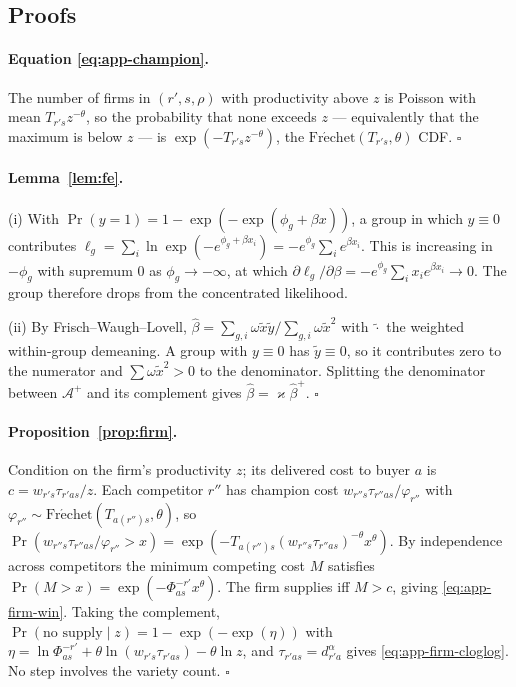 \subsection{Proofs}
\label{app:model-proofs}

\paragraph{Equation \eqref{eq:app-champion}.} The number of firms in $(r',s,\rho)$ with
productivity above $z$ is Poisson with mean $T_{r's}z^{-\theta}$, so the probability that none
exceeds $z$ --- equivalently that the maximum is below $z$ --- is $\exp(-T_{r's}z^{-\theta})$,
the $\mathrm{Fr\acute{e}chet}(T_{r's},\theta)$ CDF. \hfill$\square$

\paragraph{Lemma~\ref{lem:fe}.} (i) With $\Pr(y=1)=1-\exp(-\exp(\phi_{g}+\beta x))$, a group in
which $y\equiv0$ contributes
$\ell_{g}=\sum_{i}\ln\exp(-e^{\phi_{g}+\beta x_{i}})=-e^{\phi_{g}}\sum_{i}e^{\beta x_{i}}$. This
is increasing in $-\phi_{g}$ with supremum $0$ as $\phi_{g}\to-\infty$, at which
$\partial\ell_{g}/\partial\beta=-e^{\phi_{g}}\sum_{i}x_{i}e^{\beta x_{i}}\to0$. The group
therefore drops from the concentrated likelihood.

(ii) By Frisch--Waugh--Lovell,
$\hat\beta=\sum_{g,i}\omega\tilde x\tilde y/\sum_{g,i}\omega\tilde x^{2}$ with $\tilde{\cdot}$
the weighted within-group demeaning. A group with $y\equiv0$ has $\tilde y\equiv0$, so it
contributes zero to the numerator and $\sum\omega\tilde x^{2}>0$ to the denominator. Splitting
the denominator between $\mathcal{A}^{+}$ and its complement gives
$\hat\beta=\varkappa\hat\beta^{+}$. \hfill$\square$

\paragraph{Proposition~\ref{prop:firm}.} Condition on the firm's productivity $z$; its delivered
cost to buyer $a$ is $c=w_{r's}\tau_{r'as}/z$. Each competitor $r''$ has champion cost
$w_{r''s}\tau_{r''as}/\varphi_{r''}$ with
$\varphi_{r''}\sim\mathrm{Fr\acute{e}chet}(T_{a(r'')s},\theta)$, so
$\Pr(w_{r''s}\tau_{r''as}/\varphi_{r''}>x)=\exp(-T_{a(r'')s}(w_{r''s}\tau_{r''as})^{-\theta}x^{\theta})$.
By independence across competitors the minimum competing cost $M$ satisfies
$\Pr(M>x)=\exp(-\Phi^{-r'}_{as}x^{\theta})$. The firm supplies iff $M>c$, giving
\eqref{eq:app-firm-win}. Taking the complement,
$\Pr(\text{no supply}\mid z)=1-\exp(-\exp(\eta))$ with
$\eta=\ln\Phi^{-r'}_{as}+\theta\ln(w_{r's}\tau_{r'as})-\theta\ln z$, and
$\tau_{r'as}=d_{r'a}^{\alpha}$ gives \eqref{eq:app-firm-cloglog}. No step involves the variety
count. \hfill$\square$

